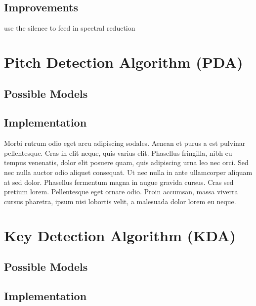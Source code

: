 \subsection{Improvements}
use the silence to feed in spectral reduction


\section{Pitch Detection Algorithm (PDA)}


\subsection{Possible Models}


\subsection{Implementation}
Morbi rutrum odio eget arcu adipiscing sodales. Aenean et purus a est pulvinar pellentesque. Cras in elit neque, quis varius elit. Phasellus fringilla, nibh eu tempus venenatis, dolor elit posuere quam, quis adipiscing urna leo nec orci. Sed nec nulla auctor odio aliquet consequat. Ut nec nulla in ante ullamcorper aliquam at sed dolor. Phasellus fermentum magna in augue gravida cursus. Cras sed pretium lorem. Pellentesque eget ornare odio. Proin accumsan, massa viverra cursus pharetra, ipsum nisi lobortis velit, a malesuada dolor lorem eu neque.

\section{Key Detection Algorithm (KDA)}

\subsection{Possible Models}


\subsection{Implementation}
